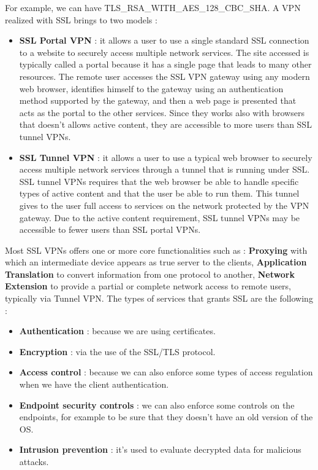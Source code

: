 \documentclass[11pt]{article}
\begin{document}
For example, we can have TLS\_RSA\_WITH\_AES\_128\_CBC\_SHA. A VPN realized with SSL brings to two models :
\begin{itemize}
\item \textbf{SSL Portal VPN} : it allows a user to use a single standard SSL connection to a website to securely access multiple network services. The site accessed is typically called a portal because it has a single page that leads to many other resources. The remote user accesses the SSL VPN gateway using any modern web browser, identifies himself to the gateway using an authentication method supported by the gateway, and then a web page is presented that acts as the portal to the other services. Since they works also with browsers that doesn't allows active content, they are accessible to more users than SSL tunnel VPNs.
\item \textbf{SSL Tunnel VPN} : it allows a user to use a typical web browser to securely access multiple network services through a tunnel that is running under SSL. SSL tunnel VPNs requires that the web browser be able to handle specific types of active content and that the user be able to run them. This tunnel gives to the user full access to services on the network protected by the VPN gateway. Due to the active content requirement, SSL tunnel VPNs may be accessible to fewer users than SSL portal VPNs.
\end{itemize} 
Most SSL VPNs offers one or more core functionalities such as : \textbf{Proxying} with which an intermediate device appears as true server to the clients, \textbf{Application Translation} to convert information from one protocol to another, \textbf{Network Extension} to provide a partial or complete network access to remote users, typically via Tunnel VPN. The types of services that grants SSL are the following :
\begin{itemize}
\item \textbf{Authentication} : because we are using certificates.
\item \textbf{Encryption} : via the use of the SSL/TLS protocol.
\item \textbf{Access control} : because we can also enforce some types of access regulation when we have the client authentication.
\item \textbf{Endpoint security controls} : we can also enforce some controls on the endpoints, for example to be sure that they doesn't have an old version of the OS.
\item \textbf{Intrusion prevention} : it's used to evaluate decrypted data for malicious attacks. 
\end{itemize}
\end{document}
